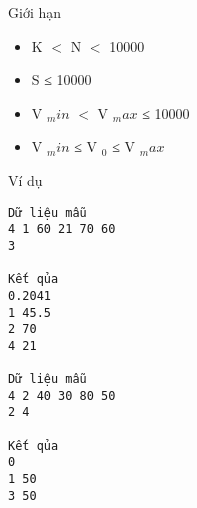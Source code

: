 Giới hạn
\begin{itemize}
	\item     K $<$ N $<$ 10000   
	\item     S ≤ 10000   
	\item     V    $_     min    $    $<$ V    $_     max    $    ≤ 10000   
	\item     V    $_     min    $    ≤ V    $_     0    $    ≤ V    $_     max    $
\end{itemize}
Ví dụ
\begin{verbatim}
Dữ liệu mẫu
4 1 60 21 70 60
3

Kết qủa
0.2041
1 45.5
2 70
4 21

Dữ liệu mẫu
4 2 40 30 80 50
2 4

Kết qủa
0
1 50
3 50
\end{verbatim}